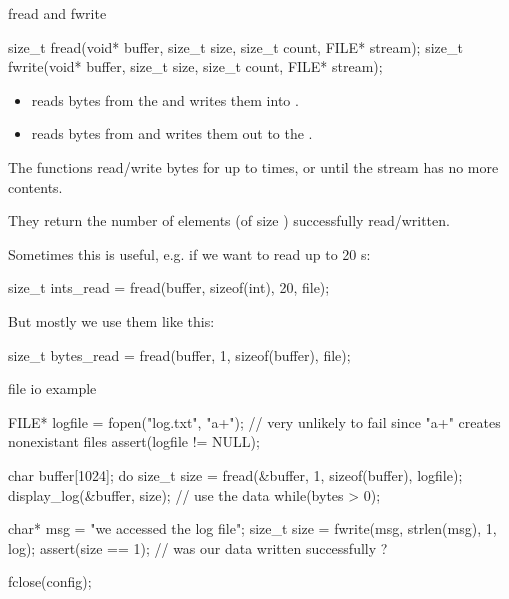 \documentclass[10pt,graphics,aspectratio=169,table]{beamer}
\begin{document}
\begin{frame}[fragile]{fread and fwrite}
    \begin{small}

    \begin{codeblock}[numbers=none, basicstyle=\small]
size_t fread(void* buffer, size_t size, size_t count, FILE* stream);
size_t fwrite(void* buffer, size_t size, size_t count, FILE* stream);
    \end{codeblock}

    \begin{itemize}
        \item {} reads bytes from the  and writes them into 
        .  

        \item {} reads bytes from  and writes them out to the 
        . 
    
    \end{itemize}

    The functions read/write  bytes for up to  times, or until 
    the stream has no more contents.

    They return the number of elements 
    (of size ) successfully read/written.

    Sometimes this is useful, e.g. if we want to read up to 20 s:
    \begin{codeblock}[numbers=none, basicstyle=\small]
size_t ints_read = fread(buffer, sizeof(int), 20, file);
    \end{codeblock}

    But mostly we use them like this:
    \begin{codeblock}[numbers=none, basicstyle=\small]
size_t bytes_read = fread(buffer, 1, sizeof(buffer), file);
    \end{codeblock}

    \end{small}
\end{frame}

\begin{frame}[fragile]{file io example}
    
    \begin{codeblock}
FILE* logfile = fopen("log.txt", "a+");
// very unlikely to fail since "a+" creates nonexistant files
assert(logfile != NULL);

char buffer[1024]; 
do{
    size_t size = fread(&buffer, 1, sizeof(buffer), logfile);
    display_log(&buffer, size); // use the data
} while(bytes > 0);

char* msg = "we accessed the log file\n";
size_t size = fwrite(msg, strlen(msg), 1, log);
assert(size == 1); // was our data written successfully ?

fclose(config);
    \end{codeblock}

\end{frame}
\end{document}
